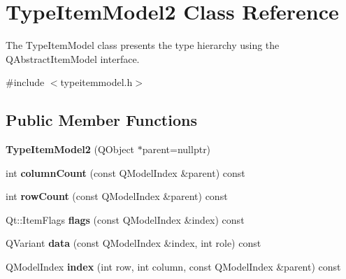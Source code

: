 \hypertarget{class_type_item_model2}{\section{\-Type\-Item\-Model2 \-Class \-Reference}
\label{class_type_item_model2}
}


\-The \-Type\-Item\-Model class presents the type hierarchy using the \-Q\-Abstract\-Item\-Model interface.  




{\ttfamily \#include $<$typeitemmodel.\-h$>$}

\subsection*{\-Public \-Member \-Functions}
\begin{DoxyCompactItemize}
\item 
\hypertarget{class_type_item_model2_adbe79b483682b77197e1960f0f8c64c2}{{\bfseries \-Type\-Item\-Model2} (\-Q\-Object $\ast$parent=nullptr)}\label{class_type_item_model2_adbe79b483682b77197e1960f0f8c64c2}

\item 
\hypertarget{class_type_item_model2_ac0592b4a858a90c1e3c6336a019ca308}{int {\bfseries column\-Count} (const \-Q\-Model\-Index \&parent) const }\label{class_type_item_model2_ac0592b4a858a90c1e3c6336a019ca308}

\item 
\hypertarget{class_type_item_model2_a158afb2888caa6b1b3aede6c99c407a6}{int {\bfseries row\-Count} (const \-Q\-Model\-Index \&parent) const }\label{class_type_item_model2_a158afb2888caa6b1b3aede6c99c407a6}

\item 
\hypertarget{class_type_item_model2_a494e353a5bc223df4075f5afceca18fb}{\-Qt\-::\-Item\-Flags {\bfseries flags} (const \-Q\-Model\-Index \&index) const }\label{class_type_item_model2_a494e353a5bc223df4075f5afceca18fb}

\item 
\hypertarget{class_type_item_model2_af8d6721961d705f0efba20f1ad544006}{\-Q\-Variant {\bfseries data} (const \-Q\-Model\-Index \&index, int role) const }\label{class_type_item_model2_af8d6721961d705f0efba20f1ad544006}

\item 
\hypertarget{class_type_item_model2_a4bf55d39159bdf8fe835bcc7564509fa}{\-Q\-Model\-Index {\bfseries index} (int row, int column, const \-Q\-Model\-Index \&parent) const }\label{class_type_item_model2_a4bf55d39159bdf8fe835bcc7564509fa}


\end{DoxyCompactItemize}

